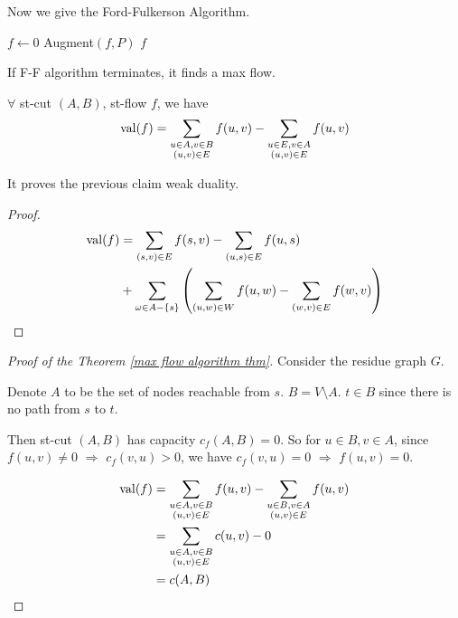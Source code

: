 Now we give the Ford-Fulkerson Algorithm.
\begin{algorithm}
    \caption{Ford-Fulkerson Algorithm}
    \begin{algorithmic}[1]
        \STATE $ f\leftarrow 0 $
            \STATE Augment$ (f,P) $
        \ENDWHILE
        \RETURN $ f $
    \end{algorithmic}
\end{algorithm}
\begin{theorem}\label{max flow algorithm thm}
    If F-F algorithm terminates, it finds a max flow.
\end{theorem}

\begin{claim}
    $ \forall $ st-cut  $ (A,B) $, st-flow  $ f $, we have 
    \[\mathrm{val}(f)=\sum_{\substack{u\in A,v\in B\\(u,v)\in E}}f(u,v)-\sum_{\substack{u\in E,v\in A\\(u,v)\in E}}f(u,v)\]   
\end{claim}
It proves the previous claim weak duality.
\begin{proof}
    \begin{align*}
        \mathrm{val}(f)&=\sum_{(s,v)\in E}f(s,v)-\sum_{(u,s)\in E}f(u,s)\\
        &+\sum_{\omega\in A-\{s\}}\left(\sum_{(u,w)\in W}f(u,w)-\sum_{(w,v)\in E}f(w,v)\right)
    \end{align*}
\end{proof}
\begin{proof}[Proof of the Theorem \ref{max flow algorithm thm}]
    Consider the residue graph  $ G $.
    
    Denote  $ A $ to be the set of nodes reachable from  $ s $.
    $ B=V\setminus A $.  $ t\in B $ since there is no path from  $ s $ to  $ t $.   
    
    Then st-cut  $ (A,B) $ has capacity  $ c_f(A,B)=0 $. So for  $ u\in B,v\in A $, since  $ f(u,v)\neq 0 $  $ \Rightarrow  $ $ c_f(v,u)>0 $, we have  $ c_f(v,u)=0 $    $ \Rightarrow  $ $ f(u,v)=0 $.   
    
    \begin{align*}
        \mathrm{val}(f)&=\sum_{\substack{u\in A,v\in B\\(u,v)\in E}}f(u,v)-\sum_{\substack{u\in B,v\in A\\(u,v)\in E}}f(u,v)\\
        &=\sum_{\substack{u\in A,v\in B\\(u,v)\in E}}c(u,v)-0\\
        &=c(A,B)
    \end{align*}
\end{proof}

